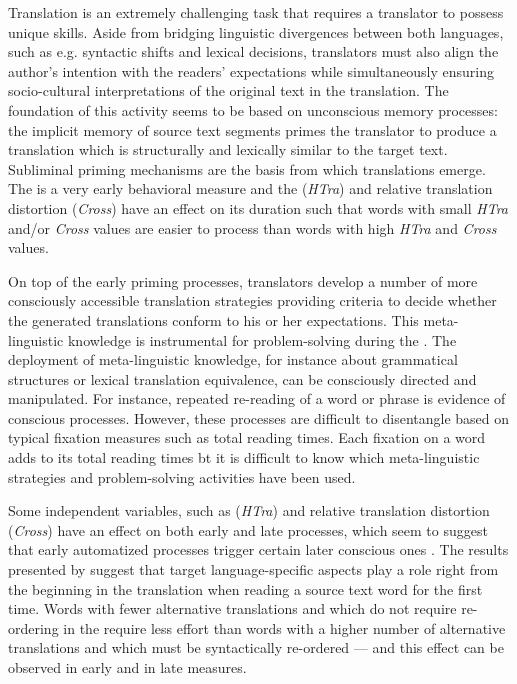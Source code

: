 \documentclass[output=paper]{LSP/langsci}
\begin{document}
Translation is an extremely challenging task that requires a translator to possess unique skills. Aside from bridging linguistic divergences between both languages, such as e.g. syntactic shifts and lexical decisions, translators must also align the author's intention with the readers' expectations while simultaneously ensuring socio-cultural interpretations of the original text in the translation. The foundation of this activity seems to be based on unconscious memory processes: the implicit memory of source text segments primes the translator to produce a translation which is structurally and lexically similar to the target text. Subliminal priming mechanisms are the basis from which translations emerge. The  is a very early behavioral measure and the  (\textit{HTra}) and relative translation distortion (\textit{Cross}) have an effect on its duration such that words with small \textit{HTra} and/or \textit{Cross} values are easier to process than words with high \textit{HTra} and \textit{Cross} values. 

On top of the early priming processes, translators develop a number of more consciously accessible translation strategies providing criteria to decide whether the generated translations conform to his or her expectations. This meta-lin\-guis\-tic knowledge is instrumental for problem-solving during the . The deployment of meta-linguistic knowledge, for instance about grammatical structures or lexical translation equivalence, can be consciously directed and manipulated. For instance, repeated re-reading of a word or phrase is evidence of conscious processes. However, these processes are difficult to disentangle based on typical fixation measures such as total reading times. Each fixation on a word adds to its total reading times bt it is difficult to know which meta-linguistic strategies and problem-solving activities have been used. 

Some independent variables, such as  (\textit{HTra}) and relative translation distortion (\textit{Cross}) have an effect on both early and late processes, which seem to suggest that early automatized processes trigger certain later conscious ones \citep{Schaeffer2013Shared}. The results presented by \citet{Schaeffer2016Word} suggest that target language-specific aspects play a role right from the beginning in the translation when reading a source text word for the first time. Words with fewer alternative translations and which do not require re-ordering in the  require less effort than words with a higher number of alternative translations and which must be syntactically re-ordered --- and this effect can be observed in early and in late measures.
\end{document}
